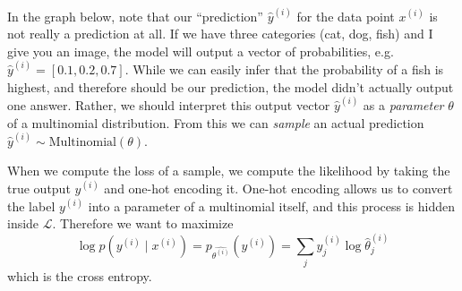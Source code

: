   \begin{example}[Softmax]
    In the graph below, note that our ``prediction'' $\hat{y}^{(i)}$ for the data point $x^{(i)}$ is not really a prediction at all. If we have three categories (cat, dog, fish) and I give you an image, the model will output a vector of probabilities, e.g. $\hat{y}^{(i)} = [0.1, 0.2, 0.7]$. While we can easily infer that the probability of a fish is highest, and therefore should be our prediction, the model didn't actually output one answer. Rather, we should interpret this output vector $\hat{y}^{(i)}$ as a \textit{parameter} $\theta$ of a multinomial distribution. From this we can \textit{sample} an actual prediction $\hat{y}^{(i)} \sim \mathrm{Multinomial}(\theta)$. 

    When we compute the loss of a sample, we compute the likelihood by taking the true output $y^{(i)}$ and one-hot encoding it. One-hot encoding allows us to convert the label $y^{(i)}$ into a parameter of a multinomial itself, and this process is hidden inside $\mathcal{L}$. Therefore we want to maximize
    \begin{equation}
      \log p(y^{(i)} \mid x^{(i)}) = p_{\hat{\theta^{(i)}}} (y^{(i)}) = \sum_j y_j^{(i)} \log  \hat{\theta}^{(i)}_j 
    \end{equation}
    which is the cross entropy. 

    \begin{figure}[H]
      \centering
      \begin{tikzpicture}[x=0.75pt,y=0.75pt,yscale=-1,xscale=1]


\end{tikzpicture}
\end{figure}
\end{example}
